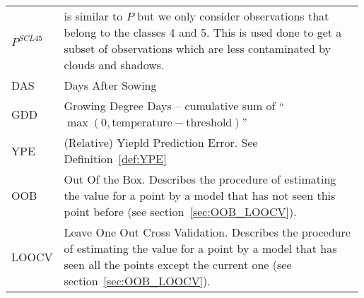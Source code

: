 \begin{longtable}{p{0.12\linewidth} p{0.87\linewidth}}
$P^{SCL45}$	
		& is similar to $P$ but we only consider observations that belong to the classes 4 and 5. This is used done to get a subset of observations which are less contaminated by clouds and shadows.\\

DAS	
		& Days After Sowing\\

GDD	
		& Growing Degree Days -- cumulative sum of ``$\max(0, \text{temperature}-\text{threshold})$''\\

YPE 	
		& (Relative) Yiepld Prediction Error. See Definition~\ref{def:YPE}\\

OOB 	
		& Out Of the Box. Describes the procedure of  estimating the value for a point by a model that has not seen this point before (see section~\ref{sec:OOB_LOOCV}).\\

LOOCV 	
		& Leave One Out Cross Validation. Describes the procedure of estimating the value for a point by a model that has seen all the points except the current one (see section~\ref{sec:OOB_LOOCV}).
\end{longtable} 

